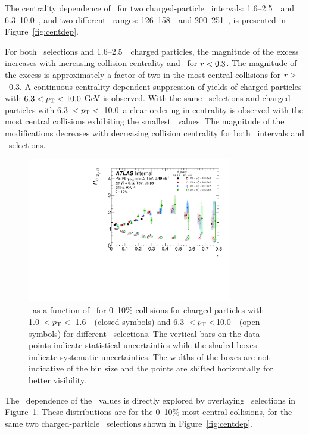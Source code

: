The centrality dependence of \RDptr\ for two charged-particle \pt\ intervals: 1.6--2.5~\GeV\ and \mbox{6.3--10.0~\GeV}, and two different \ptjet\ ranges: 126--158~\GeV\ and 200--251~\GeV, is presented in Figure~\ref{fig:centdep}.

For both \ptjet\ selections and  1.6--2.5~\GeV\ charged particles, the magnitude of the excess increases
with increasing collision centrality and \rvar\ for $\mbox{$r$} < 0.3$.
 The magnitude of the excess is
approximately a factor of two in the most central collisions for $\mbox{$r$} >$~0.3.
A continuous centrality dependent suppression of  yields of charged-particles with $6.3 < \mbox{$p_{\mathrm{T}}$} < 10.0$ GeV is observed.
With the same \ptjet\ selections and 
charged-particles with 6.3~$ < \mbox{$p_{\mathrm{T}}$} < $~10.0~\GeV a clear ordering in centrality is observed with
the most central collisions exhibiting the smallest \RDptr\ values.
The magnitude of the modifications decreases with decreasing collision centrality for both \pt\ 
intervals and \ptjet\ selections.

\begin{figure}[ht]
\centerline{
\includegraphics[width=0.8\textwidth]{figures/main/results/RDpT_dR_trk3_trk6_cent0.pdf} 
}
\caption{\RDptr\ as a function of \rvar\ for 0--10\% collisions for charged particles with 1.0~$< \mbox{$p_{\mathrm{T}}$} <$~1.6~\GeV\
(closed symbols) and 6.3~$< \mbox{$p_{\mathrm{T}}$} <$10.0~\GeV\ (open symbols) for different \ptjet\ selections.
The vertical bars on the data points indicate statistical uncertainties while the shaded boxes indicate systematic uncertainties.
The widths of the boxes are not indicative of the bin size and the points are shifted horizontally for better visibility.}
\label{fig:ptjetdep}
\end{figure}


The \ptjet\ dependence of the \RDptr\ values is directly explored by overlaying 
\ptjet\ selections in Figure~\ref{fig:ptjetdep}.
These distributions are for the 0--10\% 
most central collisions, for the same two charged-particle \pt\ selections shown in Figure~\ref{fig:centdep}.

